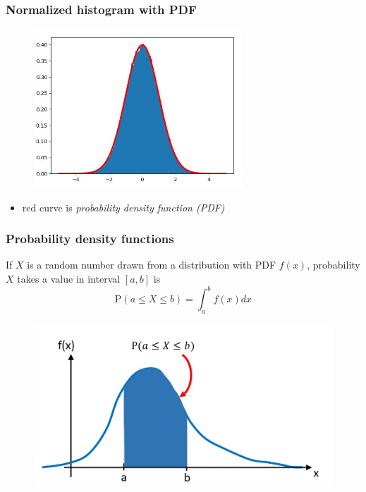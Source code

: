\documentclass[english,14pt]{beamer}
\newcommand\red[1]{{\color{red} #1}}
\begin{document}
\begin{frame}[fragile]

\frametitle{Normalized histogram with PDF}

\begin{figure}[ht]
	\centering
	\includegraphics[width=0.7\textwidth]{figures/histWithpdf}
\end{figure}

\vspace*{-5mm}

\begin{itemize}
	\item[] red curve is \red{\emph{probability density function (PDF)}}
\end{itemize}

\end{frame}


\begin{frame}[fragile]

\frametitle{Probability density functions}

If $X$ is a random number drawn from a distribution with PDF $f(x)$, probability $X$ takes a value in interval $[a,b]$ is
\vspace*{-2mm}
\[
	\boxed{
\mathrm{P}(a \leq X \leq b) = \int_a^b f(x) dx}
\]
\vspace*{-5mm}
\begin{figure}[ht]
	\centering
	\includegraphics[width=.7\textwidth]{figures/genericPDF}
\end{figure}

\end{frame}
\end{document}
